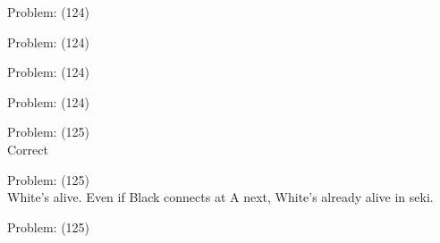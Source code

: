 \documentclass[11pt]{article}
\begin{document}
\begin{minipage}[t]{0.5\textwidth}
  {\centering
  
  Problem: (124)\\
  
  }
\end{minipage}
\begin{minipage}[t]{0.5\textwidth}
  {\centering
  
  Problem: (124)\\
  
  }
\end{minipage}
\begin{minipage}[t]{0.5\textwidth}
  {\centering
  
  Problem: (124)\\
  
  }
\end{minipage}
\begin{minipage}[t]{0.5\textwidth}
  {\centering
  
  Problem: (124)\\
  
  }
\end{minipage}
\begin{minipage}[t]{0.5\textwidth}
  {\centering
  
  Problem: (125)\\
  Correct\\
  }
\end{minipage}
\begin{minipage}[t]{0.5\textwidth}
  {\centering
  
  Problem: (125)\\
  White's alive. Even if Black connects at A next, White's already alive in seki.\\
  }
\end{minipage}
\begin{minipage}[t]{0.5\textwidth}
  {\centering
  
  Problem: (125)\\
  
  }
\end{minipage}
\end{document}
